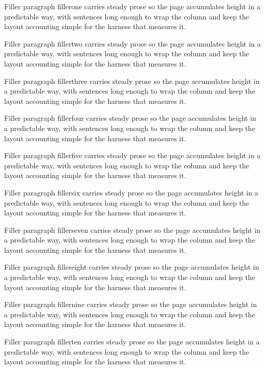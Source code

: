 \documentclass{article}
\begin{document}
Filler paragraph fillerone carries steady prose so the page accumulates height in a
predictable way, with sentences long enough to wrap the column and keep the layout
accounting simple for the harness that measures it.

Filler paragraph fillertwo carries steady prose so the page accumulates height in a
predictable way, with sentences long enough to wrap the column and keep the layout
accounting simple for the harness that measures it.

Filler paragraph fillerthree carries steady prose so the page accumulates height in a
predictable way, with sentences long enough to wrap the column and keep the layout
accounting simple for the harness that measures it.

Filler paragraph fillerfour carries steady prose so the page accumulates height in a
predictable way, with sentences long enough to wrap the column and keep the layout
accounting simple for the harness that measures it.

Filler paragraph fillerfive carries steady prose so the page accumulates height in a
predictable way, with sentences long enough to wrap the column and keep the layout
accounting simple for the harness that measures it.

Filler paragraph fillersix carries steady prose so the page accumulates height in a
predictable way, with sentences long enough to wrap the column and keep the layout
accounting simple for the harness that measures it.

Filler paragraph fillerseven carries steady prose so the page accumulates height in a
predictable way, with sentences long enough to wrap the column and keep the layout
accounting simple for the harness that measures it.

Filler paragraph fillereight carries steady prose so the page accumulates height in a
predictable way, with sentences long enough to wrap the column and keep the layout
accounting simple for the harness that measures it.

Filler paragraph fillernine carries steady prose so the page accumulates height in a
predictable way, with sentences long enough to wrap the column and keep the layout
accounting simple for the harness that measures it.

Filler paragraph fillerten carries steady prose so the page accumulates height in a
predictable way, with sentences long enough to wrap the column and keep the layout
accounting simple for the harness that measures it.
\end{document}
